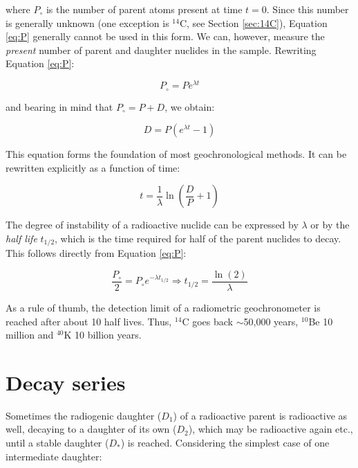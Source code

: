 where $P_\circ$ is the number of parent atoms present at time
$t=0$.  Since this number is generally unknown (one exception is
$^{14}$C, see Section \ref{sec:14C}), Equation \ref{eq:P} generally
cannot be used in this form. We can, however, measure the
\emph{present} number of parent and daughter nuclides in the
sample. Rewriting Equation \ref{eq:P}:

\begin{equation}
P_\circ = P e^{\lambda t}
\label{eq:P0}
\end{equation}

and bearing in mind that $P_\circ = P + D$, we obtain:

\begin{equation}
D = P (e^{\lambda t}- 1)
\label{eq:D}
\end{equation}

This equation forms the foundation of most geochronological
methods. It can be rewritten explicitly as a function of time:

\begin{equation}
t = \frac{1}{\lambda} \ln\left(\frac{D}{P} + 1\right)
\label{eq:t}
\end{equation}

The degree of instability of a radioactive nuclide can be expressed by
$\lambda$ or by the \emph{half life} $t_{1/2}$, which is the time
required for half of the parent nuclides to decay. This follows
directly from Equation \ref{eq:P}:

\begin{equation}
\frac{P_\circ}{2} = P_\circ e^{-\lambda t_{1/2}} 
\Rightarrow t_{1/2} = \frac{\ln(2)}{\lambda}
\label{eq:T12}
\end{equation}

As a rule of thumb, the detection limit of a radiometric
geo\-chro\-no\-me\-ter is reached after about 10 half lives. Thus,
$^{14}$C goes back $\sim$50,000 years, $^{10}$Be 10 million and
$^{40}$K 10 billion years.

\section{Decay series}
\label{sec:decay-series}

Sometimes the radiogenic daughter ($D_1$) of a radioactive parent is
radioactive as well, decaying to a daughter of its own ($D_2$), which
may be radioactive again etc., until a stable daughter ($D_*$) is
reached. Considering the simplest case of one intermediate daughter:

